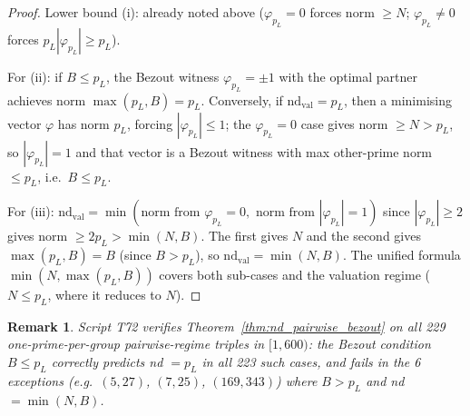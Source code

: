 \documentclass[12pt]{article}
\newtheorem{remark}{Remark}
\theoremstyle{definition}
\begin{document}
\begin{proof}
  Lower bound (i): already noted above ($\varphi_{p_L}=0$ forces norm $\ge N$;
  $\varphi_{p_L}\ne 0$ forces $p_L|\varphi_{p_L}| \ge p_L$).

  For (ii): if $B \le p_L$, the Bezout witness $\varphi_{p_L}=\pm 1$ with the
  optimal partner achieves norm $\max(p_L, B) = p_L$.
  Conversely, if $\mathrm{nd}_{\mathrm{val}}=p_L$, then a minimising vector $\varphi$ has norm $p_L$,
  forcing $|\varphi_{p_L}| \le 1$; the $\varphi_{p_L}=0$ case gives norm $\ge N > p_L$,
  so $|\varphi_{p_L}|=1$ and that vector is a Bezout witness with
  max other-prime norm $\le p_L$, i.e.\ $B \le p_L$.

  For (iii): $\mathrm{nd}_{\mathrm{val}} = \min(\text{norm from }\varphi_{p_L}=0, \text{ norm from }
  |\varphi_{p_L}|=1)$ since $|\varphi_{p_L}|\ge 2$ gives norm $\ge 2p_L > \min(N,B)$.
  The first gives $N$ and the second gives $\max(p_L,B)=B$ (since $B>p_L$),
  so $\mathrm{nd}_{\mathrm{val}} = \min(N,B)$.  The unified formula $\min(N,\max(p_L,B))$ covers
  both sub-cases and the valuation regime ($N \le p_L$, where it reduces to $N$).
\end{proof}

\begin{remark}
  Script T72 verifies Theorem~\ref{thm:nd_pairwise_bezout} on all 229
  one-prime-per-group pairwise-regime triples in $[1,600)$: the Bezout
  condition $B \le p_L$ correctly predicts nd $=p_L$ in all 223 such cases,
  and fails in the 6 exceptions (e.g.\ $(5,27)$, $(7,25)$, $(169,343)$)
  where $B > p_L$ and nd $= \min(N, B)$.
\end{remark}
\end{document}

